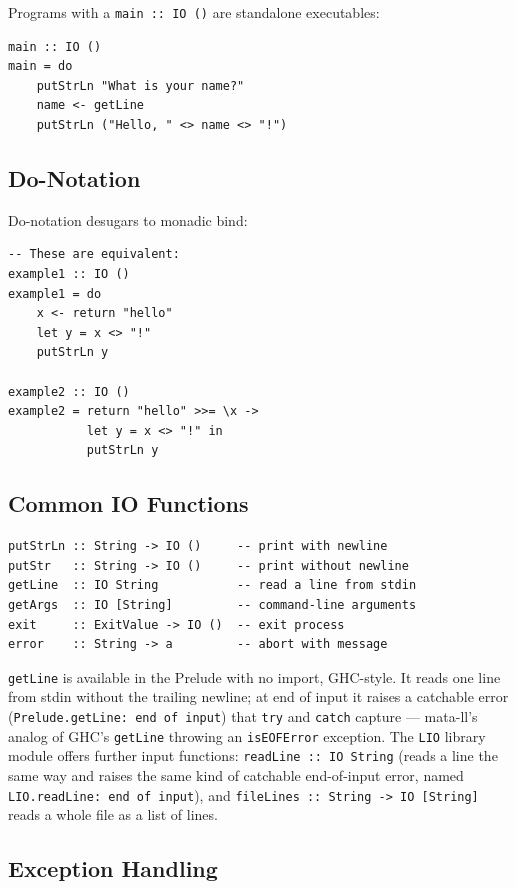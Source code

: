 \documentclass[11pt,a4paper]{article}
\begin{document}
Programs with a \texttt{main :: IO ()} are standalone executables:

\begin{lstlisting}
main :: IO ()
main = do
    putStrLn "What is your name?"
    name <- getLine
    putStrLn ("Hello, " <> name <> "!")
\end{lstlisting}

\subsection{Do-Notation}

Do-notation desugars to monadic bind:

\begin{lstlisting}
-- These are equivalent:
example1 :: IO ()
example1 = do
    x <- return "hello"
    let y = x <> "!"
    putStrLn y

example2 :: IO ()
example2 = return "hello" >>= \x ->
           let y = x <> "!" in
           putStrLn y
\end{lstlisting}

\subsection{Common IO Functions}

\begin{lstlisting}
putStrLn :: String -> IO ()     -- print with newline
putStr   :: String -> IO ()     -- print without newline
getLine  :: IO String           -- read a line from stdin
getArgs  :: IO [String]         -- command-line arguments
exit     :: ExitValue -> IO ()  -- exit process
error    :: String -> a         -- abort with message
\end{lstlisting}

\texttt{getLine} is available in the Prelude with no import,
GHC-style.  It reads one line from stdin without the trailing
newline; at end of input it raises a catchable error
(\texttt{Prelude.getLine: end of input}) that \texttt{try} and
\texttt{catch} capture --- mata-ll's analog of GHC's \texttt{getLine}
throwing an \texttt{isEOFError} exception.  The \texttt{LIO} library
module offers further input functions: \texttt{readLine :: IO String}
(reads a line the same way and raises the same kind of catchable
end-of-input error, named \texttt{LIO.readLine: end of input}), and
\texttt{fileLines :: String -> IO [String]} reads a whole file as a
list of lines.

\subsection{Exception Handling}
\end{document}
